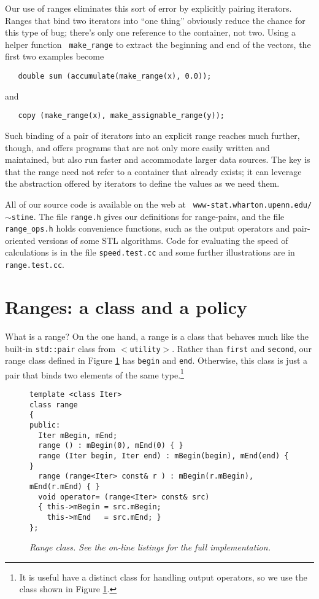 \documentclass[12pt]{article}
\begin{document}
  Our use of ranges eliminates this sort of error by explicitly
pairing iterators.  Ranges that bind two iterators into ``one thing''
obviously reduce the chance for this type of bug; there's only one
reference to the container, not two.  Using a helper function {\tt
make\_range} to extract the beginning and end of the vectors, the
first two examples become
\begin{verbatim} 
   double sum (accumulate(make_range(x), 0.0));
\end{verbatim}
and
\begin{verbatim}
   copy (make_range(x), make_assignable_range(y));
\end{verbatim}
Such binding of a pair of iterators into an explicit range reaches
much further, though, and offers programs that are not only more
easily written and maintained, but also run faster and accommodate
larger data sources.  The key is that the range need not refer to a
container that already exists; it can leverage the abstraction offered
by iterators to define the values as we need them.


  All of our source code is available on the web at {\tt
www-stat.wharton.upenn.edu/$\sim$stine}.  The file {\tt range.h} gives our
definitions for range-pairs, and the file {\tt range\_ops.h} holds
convenience functions, such as the output operators and pair-oriented
versions of some STL algorithms.  Code for evaluating the speed of
calculations is in the file {\tt speed.test.cc} and some further
illustrations are in {\tt range.test.cc}.


\section{Ranges: a class and a policy}

  What is a range?  On the one hand, a range is a class that behaves
much like the built-in {\tt std::pair} class from {\tt $<$utility$>$}.
Rather than {\tt first} and {\tt second}, our range class defined in
Figure \ref{fi:range-class} has {\tt begin} and {\tt end}.  Otherwise,
this class is just a pair that binds two elements of the same
type.\footnote{It is useful have a distinct class for handling output
operators, so we use the class shown in Figure \ref{fi:range-class}.}

\begin{figure}
\caption{ \label{fi:range-class} 
\it Range class.  See the on-line listings for the full implementation.}
\begin{verbatim}
template <class Iter>
class range
{
public:
  Iter mBegin, mEnd;
  range () : mBegin(0), mEnd(0) { }
  range (Iter begin, Iter end) : mBegin(begin), mEnd(end) { }
  range (range<Iter> const& r ) : mBegin(r.mBegin), mEnd(r.mEnd) { }
  void operator= (range<Iter> const& src)
  { this->mBegin = src.mBegin;
    this->mEnd   = src.mEnd; } 
};
\end{verbatim}
\end{figure}
\end{document}
